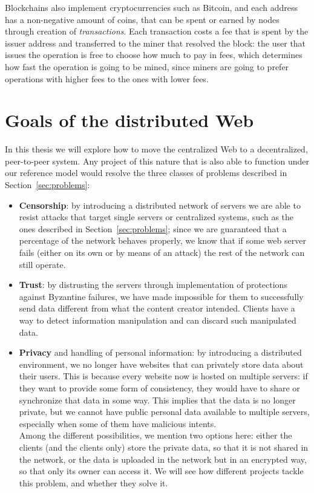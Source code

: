 \documentclass[mscthesis]{usiinfthesis}
\begin{document}
Blockchains also implement cryptocurrencies such as Bitcoin, and each address has a non-negative amount of coins, that can be spent or earned by nodes through creation of \emph{transactions}. Each transaction costs a fee that is spent by the issuer address and transferred to the miner that resolved the block: the user that issues the operation is free to choose how much to pay in fees, which determines how fast the operation is going to be mined, since miners are going to prefer operations with higher fees to the ones with lower fees.


\section{Goals of the distributed Web}\label{sec:goals}

In this thesis we will explore how to move the centralized Web to a decentralized, peer-to-peer system. Any project of this nature that is also able to function under our reference model would resolve the three classes of problems described in Section~\ref{sec:problems}:
\begin{itemize}
	\item \textbf{Censorship}: by introducing a distributed network of servers we are able to resist attacks that target single servers or centralized systems, such as the ones described in Section~\ref{sec:problems}; since we are guaranteed that a percentage of the network behaves properly, we know that if some web server fails (either on its own or by means of an attack) the rest of the network can still operate.
	
	\item \textbf{Trust}: by distrusting the servers through implementation of protections against Byzantine failures, we have made impossible for them to successfully send data different from what the content creator intended. Clients have a way to detect information manipulation and can discard such manipulated data.
	
	\item \textbf{Privacy} and handling of personal information: by introducing a distributed environment, we no longer have websites that can privately store data about their users. This is because every website now is hosted on multiple servers: if they want to provide some form of consistency, they would have to share or synchronize that data in some way. This implies that the data is no longer private, but we cannot have public personal data available to multiple servers, especially when some of them have malicious intents.\\
	Among the different possibilities, we mention two options here: either the clients (and the clients only) store the private data, so that it is not shared in the network, or the data is uploaded in the network but in an encrypted way, so that only its owner can access it. We will see how different projects tackle this problem, and whether they solve it.
\end{itemize}
\end{document}
